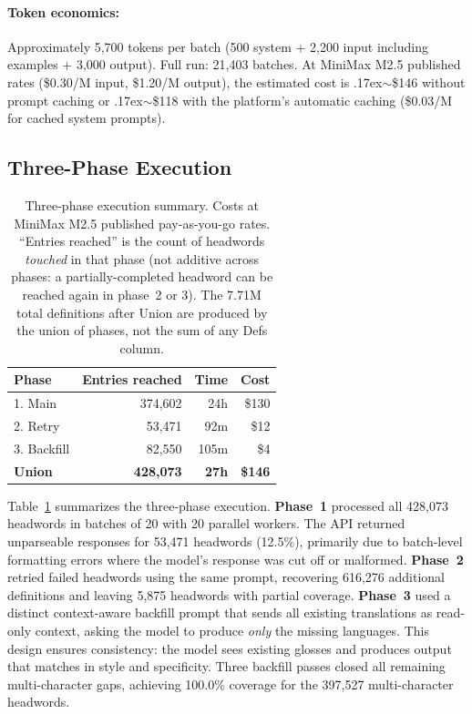 \documentclass[11pt]{article}
\begin{document}
\paragraph{Token economics:} Approximately 5,700 tokens per batch (500 system + 2,200 input including examples + 3,000 output). Full run: 21,403 batches. At MiniMax M2.5 published rates (\$0.30/M input, \$1.20/M output), the estimated cost is {\raise.17ex\hbox{$\scriptstyle\sim$}}\$146 without prompt caching or {\raise.17ex\hbox{$\scriptstyle\sim$}}\$118 with the platform's automatic caching (\$0.03/M for cached system prompts).

\subsection{Three-Phase Execution}

\begin{table}[t]
\centering
\small
\begin{tabular}{lrrr}
\toprule
\textbf{Phase} & \textbf{Entries reached} & \textbf{Time} & \textbf{Cost} \\
\midrule
1. Main     & 374,602 & 24h & \$130 \\
2. Retry    &  53,471 & 92m & \$12 \\
3. Backfill &  82,550 & 105m & \$4 \\
\midrule
\textbf{Union} & \textbf{428,073} & \textbf{27h} & \textbf{\$146} \\
\bottomrule
\end{tabular}
\caption{Three-phase execution summary. Costs at MiniMax M2.5 published pay-as-you-go rates. ``Entries reached'' is the count of headwords \textit{touched} in that phase (not additive across phases: a partially-completed headword can be reached again in phase~2 or 3). The 7.71M total definitions after Union are produced by the union of phases, not the sum of any Defs column.}
\label{tab:phases}
\end{table}

Table~\ref{tab:phases} summarizes the three-phase execution. \textbf{Phase~1} processed all 428,073 headwords in batches of 20 with 20 parallel workers. The API returned unparseable responses for 53,471 headwords (12.5\%), primarily due to batch-level formatting errors where the model's response was cut off or malformed. \textbf{Phase~2} retried failed headwords using the same prompt, recovering 616,276 additional definitions and leaving 5,875 headwords with partial coverage. \textbf{Phase~3} used a distinct context-aware backfill prompt that sends all existing translations as read-only context, asking the model to produce \textit{only} the missing languages. This design ensures consistency: the model sees existing glosses and produces output that matches in style and specificity. Three backfill passes closed all remaining multi-character gaps, achieving 100.0\% coverage for the 397,527 multi-character headwords.
\end{document}
